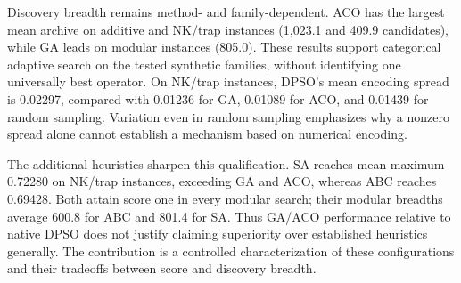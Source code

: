 \documentclass[sigconf,nonacm]{acmart}
\begin{document}
Discovery breadth remains method- and family-dependent. ACO has the largest mean archive on additive and NK/trap instances (1,023.1 and 409.9 candidates), while GA leads on modular instances (805.0). These results support categorical adaptive search on the tested synthetic families, without identifying one universally best operator. On NK/trap instances, DPSO's mean encoding spread is 0.02297, compared with 0.01236 for GA, 0.01089 for ACO, and 0.01439 for random sampling. Variation even in random sampling emphasizes why a nonzero spread alone cannot establish a mechanism based on numerical encoding.

The additional heuristics sharpen this qualification. SA reaches mean maximum 0.72280 on NK/trap instances, exceeding GA and ACO, whereas ABC reaches 0.69428. Both attain score one in every modular search; their modular breadths average 600.8 for ABC and 801.4 for SA. Thus GA/ACO performance relative to native DPSO does not justify claiming superiority over established heuristics generally. The contribution is a controlled characterization of these configurations and their tradeoffs between score and discovery breadth.
\end{document}
